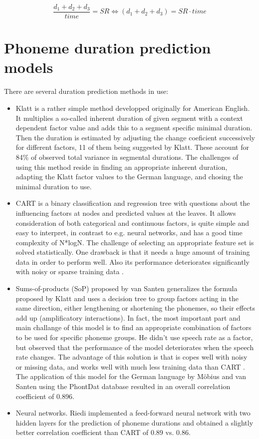 \documentclass[a4paper]{scrreprt}
\begin{document}
$$\frac{d_1+d_2+d_3}{time} = SR \iff (d_1+d_2+d_3)  = SR \cdot time $$

\chapter{Phoneme duration prediction models}
There are several duration prediction methods in use: 
\begin{itemize}
	\item Klatt \cite{Klatt1979} is a rather simple method developped originally for American English. It multiplies a so-called inherent duration of given segment with a context dependent factor value and adds this to a segment specific minimal duration. Then the duration is estimated by adjusting the change coeficient successively for different factors, 11 of them being suggested by Klatt. These account for 84\% of observed total variance in segmental durations. The challenges of using this method reside in finding an appropriate inherent duration, adapting the Klatt factor values to the German language, and chosing the minimal duration to use.
	\item CART \cite{Riley1992} is a binary classification and regression tree with questions about the influencing factors at nodes and predicted values at the leaves. It allows consideration of both categorical and continuous factors, is quite simple and easy to interpret, in contrast to e.g. neural networks, and has a good time complexity of N*logN. The challenge of selecting an appropriate feature set is solved statistically. One drawback is that it needs a huge amount of training data in order to perform well. Also its performance deteriorates significantly with noisy or sparse training data \cite{Moebius1996}.
	\item Sums-of-products (SoP) proposed by van Santen \cite{Santen1994} generalizes the formula proposed by Klatt and uses a decision tree to group factors acting in the same direction, either lengthening or shortening the phonemes, so their effects add up (amplificatory interactions). In fact, the most important part and main challange of this model is to find an appropriate combination of factors to be used for specific phoneme groups. He didn't use speech rate as a factor, but observed that the performance of the model deteriorates when the speech rate changes. The advantage of this solution is that is copes well with noisy or missing data, and works well with much less training data than CART \cite{Moebius1996}. The application of this model for the German language by Möbius and van Santen using the PhontDat database resulted in an overall correlation coefficient of 0.896.
	\item Neural networks. Riedi \cite{Riedi1995} implemented a feed-forward neural network with two hidden layers for the prediction of phoneme durations and obtained a slightly better correlation coefficient than CART of 0.89 vs. 0.86.
\end{itemize}
\end{document}
